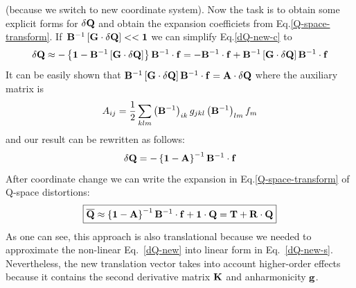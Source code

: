 \documentclass[a4paper,titlepage,twoside,fleqn,12pt]{book}
\begin{document}
\begin{refsection}
(because we switch to new coordinate system).
Now the task is to obtain some explicit forms for $\delta {\bf Q}$ and
obtain the expansion coefficiets from Eq.\eqref{Q-space-transform}.
%
If~${\bf B}^{-1} \left[ {\bf G} \cdot \delta {\bf Q} \right] << {\bf 1} $ 
we can simplify Eq.\eqref{dQ-new-c} to
%
\begin{equation}\label{dQ-new-s}
\delta {\bf Q} \approx
-\left\{ 
       {\bf 1} - {\bf B}^{-1} \left[ {\bf G} \cdot \delta {\bf Q} \right]
\right\} {\bf B}^{-1} \cdot {\bf f} = 
%
- {\bf B}^{-1} \cdot {\bf f} + {\bf B}^{-1} \left[ {\bf G} \cdot \delta {\bf Q} \right] {\bf B}^{-1} \cdot {\bf f}
\end{equation}
%
It can be easily shown that 
${\bf B}^{-1} \left[ {\bf G} \cdot \delta {\bf Q} \right] {\bf B}^{-1} \cdot {\bf f} = {\bf A} \cdot \delta {\bf Q}$
where the auxiliary matrix is
%
\begin{equation}\label{A}
A_{ij} = \frac{1}{2}\sum_{klm} 
   \left( {\bf B}^{-1} \right)_{ik} g_{jkl} \left( {\bf B}^{-1} \right)_{lm} f_m
\end{equation}
%
and our result can be rewritten as follows:
%
\begin{equation}\label{dQ-T1}
\delta {\bf Q} = -  \left\{ {\bf 1} - {\bf A} \right\}^{-1} {\bf B}^{-1} \cdot {\bf f}
\end{equation}
%
After coordinate change we can write the expansion in Eq.\eqref{Q-space-transform} 
of Q-space distortions:
\begin{equation}\label{Q-new-T1}
\boxed{
{\bf \overline{Q}} \approx  \left\{ {\bf 1} - {\bf A} \right\}^{-1} {\bf B}^{-1} \cdot {\bf f} + {\bf 1} \cdot {\bf Q}
= {\bf T} + {\bf R} \cdot {\bf Q}
}
\end{equation}
%
As one can see, this approach is also translational because 
we needed to approximate the non-linear Eq.~\eqref{dQ-new} into
linear form in Eq.~\eqref{dQ-new-s}.
Nevertheless, the new translation vector takes into account
higher-order effects because it contains the second derivative matrix $\bf K$
and anharmonicity $\bf g$.


\end{refsection}
\end{document}
